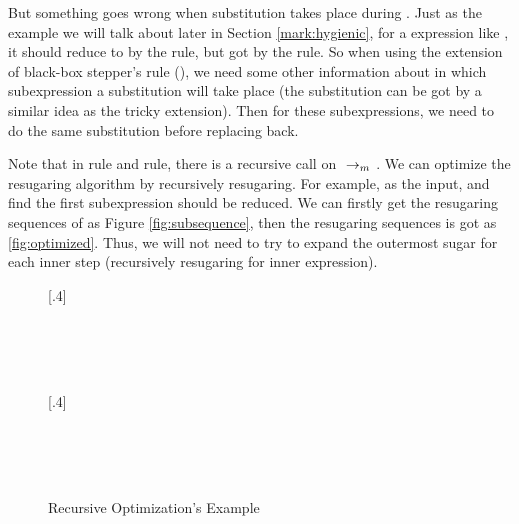 {\begin{center}
\end{center}

But something goes wrong when substitution takes place during . Just as the example we will talk about later in Section \ref{mark:hygienic}, for a expression like , it should reduce to  by the  rule, but got  by the  rule. So when using the extension of black-box stepper's rule (), we need some other information about in which subexpression a substitution will take place (the substitution can be got by a similar idea as the tricky extension). Then for these subexpressions, we need to do the same substitution before replacing back. 
}



\label{mark:optimize}
Note that in  rule and  rule, there is a recursive call on $~\rightarrow_m~$. We can optimize the resugaring algorithm by recursively resugaring. For example,  as the input, and find the first subexpression should be reduced. We can firstly get the resugaring sequences of  as Figure \ref{fig:subsequence}, then the resugaring sequences is got as \ref{fig:optimized}. Thus, we will not need to try to expand the outermost sugar for each inner step (recursively resugaring for inner expression).
\begin{figure}[t]
\centering
{}[.4\linewidth]{
\begin{flushleft}
{\small
  \qquad {}\\
  \\
 \\
}
\end{flushleft}
}
[.4\linewidth]{
\begin{flushleft}
{\small
  \qquad {}\\
  \\
 \\
}
\end{flushleft}
}
\caption{Recursive Optimization's Example}
\label{fig:optimize}
\end{figure}

